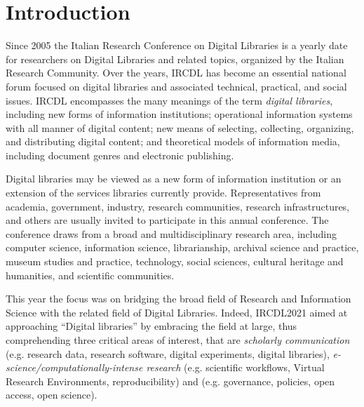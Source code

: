 \documentclass[sigconf, nonacm]{acmart}
\begin{document}


\maketitle

\section{Introduction}
Since 2005 the Italian Research Conference on Digital Libraries is a yearly date for researchers on Digital Libraries and related topics, organized by the Italian Research Community. Over the years, IRCDL has become an essential national forum focused on digital libraries and associated technical, practical, and social issues. IRCDL encompasses the many meanings of the term \emph{digital libraries}, including new forms of information institutions; operational information systems with all manner of digital content; new means of selecting, collecting, organizing, and distributing digital content; and theoretical models of information media, including document genres and electronic publishing. 

Digital libraries may be viewed as a new form of information institution or an extension of the services libraries currently provide. Representatives from academia, government, industry, research communities, research infrastructures, and others are usually invited to participate in this annual conference. The conference draws from a broad and multidisciplinary research area, including computer science, information science, librarianship, archival science and practice, museum studies and practice, technology, social sciences, cultural heritage and humanities, and scientific communities. 

This year the focus was on bridging the broad field of Research and Information Science with the related field of Digital Libraries. Indeed, IRCDL2021 aimed at approaching ``Digital libraries'' by embracing the field at large, thus comprehending three critical areas of interest, that are \emph{scholarly communication} (e.g. research data, research software, digital experiments, digital libraries), \emph{e-science/computationally-intense research} (e.g. scientific workflows, Virtual Research Environments, reproducibility) and  (e.g. governance, policies, open access, open science).
\end{document}
